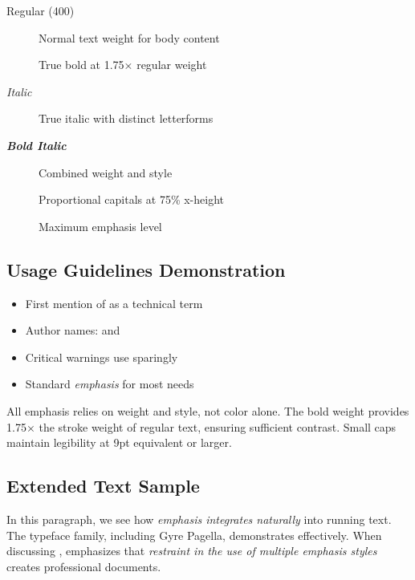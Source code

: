 \documentclass[11pt,a4paper]{article}
\begin{document}
\begin{description}
\item[Regular (400)] Normal text weight for body content
\item[] True bold at 1.75× regular weight
\item[\emph{Italic}] True italic with distinct letterforms
\item[\textbf{\emph{Bold Italic}}] Combined weight and style
\item[] Proportional capitals at 75\% x-height
\item[] Maximum emphasis level
\end{description}

\subsection{Usage Guidelines Demonstration}

\begin{itemize}
\item First mention of  as a technical term
\item Author names:  and 
\item Critical warnings use  sparingly
\item Standard \emph{emphasis} for most needs
\end{itemize}

All emphasis relies on weight and style, not color alone. The bold weight provides 1.75× the stroke weight of regular text, ensuring sufficient contrast. Small caps maintain legibility at 9pt equivalent or larger.

\subsection{Extended Text Sample}

\lipsum[1]

In this paragraph, we see how \emph{emphasis integrates naturally} into running text. The  typeface family, including  Gyre Pagella, demonstrates  effectively. When discussing ,  emphasizes that \emph{restraint in the use of \emph{multiple} emphasis styles} creates professional documents.

\lipsum[2]
\end{document}
